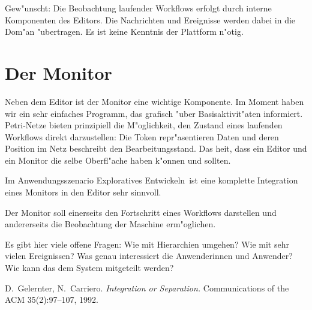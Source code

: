 \documentclass[a4paper,12pt]{article}
\newlength{\st}\setlength{\st}{0pt}
\begin{document}
Gew"unscht: Die Beobachtung laufender Workflows erfolgt durch interne
Komponenten des Editors. Die Nachrichten und Ereignisse werden dabei
in die Dom"an "ubertragen. Es ist keine Kenntnis der Plattform n"otig.

\section{Der Monitor}

Neben dem Editor ist der Monitor eine wichtige Komponente. Im Moment
haben wir ein sehr einfaches Programm, das grafisch "uber
Basisaktivit"aten informiert. Petri-Netze bieten prinzipiell die
M"oglichkeit, den Zustand eines laufenden Workflows direkt
darzustellen: Die Token repr"asentieren Daten und deren Position im
Netz beschreibt den Bearbeitungsstand. Das hei\3t, dass ein Editor und
ein Monitor die selbe Oberfl"ache haben k"onnen und sollten.

Im Anwendungsszenario \glqq Exploratives Entwickeln\grqq\ ist eine
komplette Integration eines Monitors in den Editor sehr sinnvoll.

Der Monitor soll einerseits den Fortschritt eines Workflows darstellen
und andererseits die Beobachtung der Maschine erm"oglichen.

Es gibt hier viele offene Fragen: Wie mit Hierarchien umgehen? Wie mit
sehr vielen Ereignissen? Was genau interessiert die Anwenderinnen und
Anwender? Wie kann das dem System mitgeteilt werden?

\renewcommand{\bibname}{Literatur}
\begin{thebibliography}{\quad}

D.~Gelernter, N.~Carriero. \emph{Integration or
    Separation.} Communications of the ACM 35(2):97--107, 1992.

\end{thebibliography}
\end{document}
